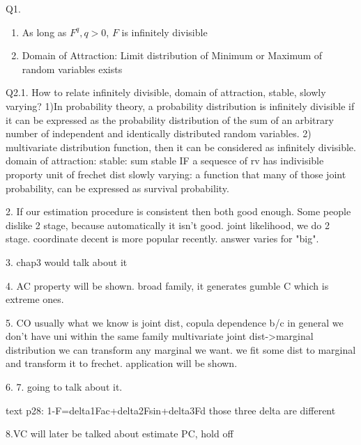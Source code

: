 \documentclass[a4paper,12pt]{texMemo}
\begin{document}
\maketitle %
Q1.

\begin{enumerate}
\item As long as $F^q, q>0$, $F$ is infinitely divisible
\item Domain of Attraction: Limit distribution of Minimum or Maximum of random variables exists
\end{enumerate}

Q2.1. How to relate infinitely divisible, domain of attraction, stable, slowly varying?
1)In probability theory, a probability distribution is infinitely divisible if it can be expressed as the probability distribution of the sum of an arbitrary number of independent and identically distributed random variables. 
2)
multivariate distribution function,
then it can be considered as infinitely divisible.
domain of attraction: 
stable:
sum stable
IF a sequesce of rv has indivisible proporty
unit of frechet dist
slowly varying: a function that 
many of those joint probability, can be expressed as survival probability.

2. 
If our estimation procedure is consistent then both good enough.
Some people dislike 2 stage, because automatically it isn't good.
joint likelihood, we do 2 stage.
coordinate decent is more popular recently.
answer varies for "big".

3. chap3 would talk about it

4. AC property will be shown. broad family, it generates gumble C which is extreme ones.

5. CO usually what we know is joint dist, 
copula dependence b/c in general we don't have uni within the same family
multivariate joint dist->marginal distribution
we can transform any marginal we want. 
we fit some dist to marginal and transform it to frechet. 
application will be shown.

6. 7. going to talk about it.

text p28: 1-F=delta1Fac+delta2Fsin+delta3Fd those three delta are different

8.VC will later be talked about
estimate PC, hold off
\end{document}

